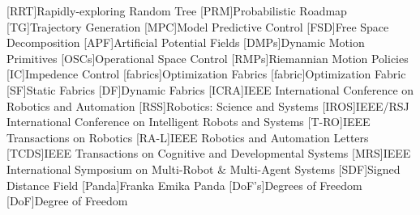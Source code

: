 [RRT]{Rapidly-exploring Random Tree}
[PRM]{Probabilistic Roadmap}
[TG]{Trajectory Generation}
[MPC]{Model Predictive Control}
[FSD]{Free Space Decomposition}
[APF]{Artificial Potential Fields}
[DMPs]{Dynamic Motion Primitives}
[OSCs]{Operational Space Control}
[RMPs]{Riemannian Motion Policies}
[IC]{Impedence Control}
[fabrics]{Optimization Fabrics}
[fabric]{Optimization Fabric}
[SF]{Static Fabrics}
[DF]{Dynamic Fabrics}
[ICRA]{IEEE International Conference on Robotics and Automation}
[RSS]{Robotics: Science and Systems}
[IROS]{IEEE/RSJ International Conference on Intelligent Robots and Systems}
[T-RO]{IEEE Transactions on Robotics}
[RA-L]{IEEE Robotics and Automation Letters}
[TCDS]{IEEE Transactions on Cognitive and Developmental Systems}
[MRS]{IEEE International Symposium on Multi-Robot \& Multi-Agent Systems}
[SDF]{Signed Distance Field}
[Panda]{Franka Emika Panda}
[DoF's]{Degrees of Freedom}
[DoF]{Degree of Freedom}

\newcommand{\tn}[1]{\textnormal{#1}}
\newcommand{\tb}[1]{\textbf{#1}}
\newcommand{\ti}[1]{\textit{#1}}
\newcommand{\va}{\mathbf{a}}
\newcommand{\vb}{\mathbf{b}}
\newcommand{\vc}{\mathbf{c}}
\newcommand{\vd}{\mathbf{d}}
\newcommand{\ve}{\mathbf{e}}
\newcommand{\vf}{\mathbf{f}}
\newcommand{\vg}{\mathbf{g}}
\newcommand{\vh}{\mathbf{h}}
\newcommand{\vl}{\mathbf{l}}
\newcommand{\vm}{\mathbf{m}}
\newcommand{\vn}{\mathbf{n}}
\newcommand{\vp}{\mathbf{p}}
\newcommand{\vq}{\mathbf{q}}
\newcommand{\vr}{\mathbf{r}}
\newcommand{\vs}{\mathbf{s}}
\newcommand{\vS}{\mathbf{S}}
\newcommand{\vo}{\mathbf{o}}
\newcommand{\vt}{\mathbf{t}}
\newcommand{\vu}{\mathbf{u}}
\newcommand{\vv}{\mathbf{v}}
\newcommand{\vw}{\mathbf{w}}
\newcommand{\vx}{\mathbf{x}}
\newcommand{\vX}{\mathbf{X}}
\newcommand{\vy}{\mathbf{y}}
\newcommand{\vz}{\mathbf{z}}
\newcommand{\cA}{\mathcal{A}}
\newcommand{\cB}{\mathcal{B}}
\newcommand{\cC}{\mathcal{C}}
\newcommand{\cD}{\mathcal{D}}
\newcommand{\cE}{\mathcal{E}}
\newcommand{\cF}{\mathcal{F}}
\newcommand{\cG}{\mathcal{G}}
\newcommand{\cH}{\mathcal{H}}
\newcommand{\cI}{\mathcal{I}}
\newcommand{\cJ}{\mathcal{J}}
\newcommand{\cK}{\mathcal{K}}
\newcommand{\cL}{\mathcal{L}}
\newcommand{\cM}{\mathcal{M}}
\newcommand{\cN}{\mathcal{N}}
\newcommand{\cO}{\mathcal{O}}
\newcommand{\cP}{\mathcal{P}}
\newcommand{\cQ}{\mathcal{Q}}
\newcommand{\cR}{\mathcal{R}}
\newcommand{\cS}{\mathcal{S}}
\newcommand{\cT}{\mathcal{T}}
\newcommand{\cU}{\mathcal{U}}
\newcommand{\cV}{\mathcal{V}}
\newcommand{\cW}{\mathcal{W}}
\newcommand{\cX}{\mathcal{X}}
\newcommand{\cY}{\mathcal{Y}}
\newcommand{\cZ}{\mathcal{Z}}

